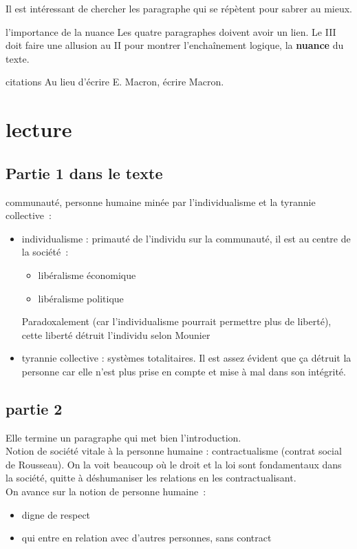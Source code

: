 \begin{remarque}{3}{}
    Il est intéressant de chercher les paragraphe qui se répètent pour sabrer au mieux.
\end{remarque}


\begin{remarque}{4}{l'importance de la nuance}
    Les quatre paragraphes doivent avoir un lien. Le III doit faire une allusion au II pour montrer l'enchaînement logique, la \textbf{nuance} du texte.
\end{remarque}

\begin{remarque}{5}{citations}
    Au lieu d'écrire E. Macron, écrire Macron.
\end{remarque}

\section{lecture}
\subsection{Partie 1 dans le texte}
communauté, personne humaine minée par l'individualisme et la tyrannie collective~:
\begin{itemize}
    \item individualisme : primauté de l'individu sur la communauté, il est au centre de la société~:
    \begin{itemize}
        \item libéralisme économique
        \item libéralisme politique
    \end{itemize}
    Paradoxalement (car l'individualisme pourrait permettre plus de liberté), cette liberté détruit l'individu selon Mounier
    \item tyrannie collective : systèmes totalitaires. Il est assez évident que ça détruit la personne car elle n'est plus prise en compte et mise à mal dans son intégrité.
\end{itemize}

\subsection{partie 2}
Elle termine un paragraphe qui met bien l'introduction.\\
Notion de société vitale à la personne humaine : contractualisme (contrat social de Rousseau). On la voit beaucoup où le droit et la loi sont fondamentaux dans la société, quitte à déshumaniser les relations en les contractualisant.\\
On avance sur la notion de personne humaine~:
\begin{itemize}
    \item digne de respect
    \item qui entre en relation avec d'autres personnes, sans contract
\end{itemize}

